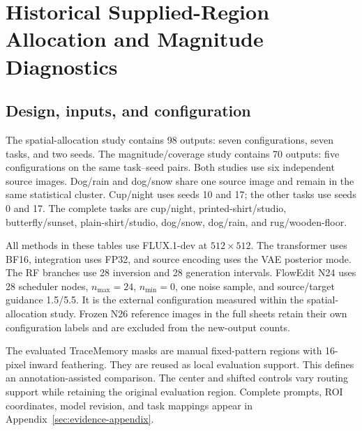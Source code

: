 \documentclass[conference]{IEEEtran}
\begin{document}




\section{Historical Supplied-Region Allocation and Magnitude Diagnostics}
\label{sec:results}
\subsection{Design, inputs, and configuration}
The spatial-allocation study contains 98 outputs: seven configurations, seven tasks, and two seeds. The magnitude/coverage study contains 70 outputs: five configurations on the same task--seed pairs. Both studies use six independent source images. Dog/rain and dog/snow share one source image and remain in the same statistical cluster. Cup/night uses seeds 10 and 17; the other tasks use seeds 0 and 17. The complete tasks are cup/night, printed-shirt/studio, butterfly/sunset, plain-shirt/studio, dog/snow, dog/rain, and rug/wooden-floor.

All methods in these tables use FLUX.1-dev at $512\times512$. The transformer uses BF16, integration uses FP32, and source encoding uses the VAE posterior mode. The RF branches use 28 inversion and 28 generation intervals. FlowEdit N24 uses 28 scheduler nodes, $n_{\max}=24$, $n_{\min}=0$, one noise sample, and source/target guidance 1.5/5.5. It is the external configuration measured within the spatial-allocation study. Frozen N26 reference images in the full sheets retain their own configuration labels and are excluded from the new-output counts.

The evaluated TraceMemory masks are manual fixed-pattern regions with 16-pixel inward feathering. They are reused as local evaluation support. This defines an annotation-assisted comparison. The center and shifted controls vary routing support while retaining the original evaluation region. Complete prompts, ROI coordinates, model revision, and task mappings appear in Appendix~\ref{sec:evidence-appendix}.
\end{document}
